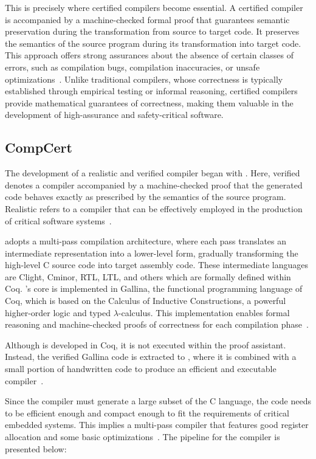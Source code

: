 This is precisely where certified compilers become essential. A certified compiler is accompanied by a machine-checked formal proof 
that guarantees semantic preservation during the transformation from source to target code. It preserves the semantics of the source 
program during its transformation into target code. This approach offers strong assurances about the absence of certain classes of 
errors, such as compilation bugs, compilation inaccuracies, or unsafe optimizations~\cite{Leroy09}. Unlike traditional compilers, 
whose correctness is typically established through empirical testing or informal reasoning, certified compilers provide mathematical 
guarantees of correctness, making them valuable in the development of high-assurance and safety-critical software.

\subsection{CompCert}
\label{sec:CompCert}

The development of a realistic and verified compiler began with \compcert. Here, verified denotes a compiler accompanied by
a machine-checked proof that the generated code behaves exactly as prescribed by the semantics of the source program.
Realistic refers to a compiler that can be effectively employed in the production of critical software systems~\cite{Leroy09-back-end}.

\compcert adopts a multi-pass compilation architecture, where each pass translates an intermediate representation into a lower-level 
form, gradually transforming the high-level C source code into target assembly code. These intermediate languages are Clight, Cminor, 
RTL, LTL, and others which are formally defined within Coq. \compcert's core is implemented in Gallina, the functional programming 
language of Coq, which is based on the Calculus of Inductive Constructions, a powerful higher-order logic and typed $\lambda$-calculus. 
This implementation enables formal reasoning and machine-checked proofs of correctness for each compilation phase~\cite{MonniauxB22}.

Although \compcert is developed in Coq, it is not executed within the proof assistant. Instead, the verified Gallina code is extracted 
to \ocaml, where it is combined with a small portion of handwritten \ocaml code to produce an efficient and executable 
compiler~\cite{MonniauxB22}.

Since the compiler must generate a large subset of the C language, the code needs to be efficient enough and compact enough to fit the 
requirements of critical embedded systems. This implies a multi-pass compiler that features good register allocation and some basic 
optimizations~\cite{Leroy09-back-end}. The pipeline for the compiler is presented below:

